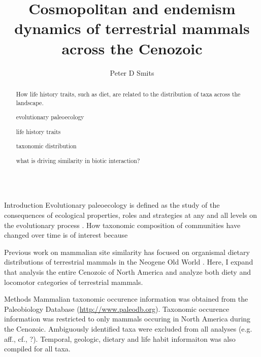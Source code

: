 \documentclass[final]{beamer}\usepackage[]{graphicx}\usepackage[]{color}
\title{Cosmopolitan and endemism dynamics of terrestrial mammals across the Cenozoic}
\author{Peter D Smits}
\institute{Committee on Evolutionary Biology, University of Chicago}
\newlength{\onecolwid}
\begin{document}
\begin{frame}[t]
  \begin{columns}
    \begin{column}{\onecolwid}
      \begin{block}{}
        \begin{abstract}
          How life history traits, such as diet, are related to the distribution of taxa across the landscape.

          evolutionary paleoecology

          life history traits

          taxonomic distribution

          what is driving similarity in biotic interaction?
        \end{abstract}
        
      \end{block}
      \begin{block}{Introduction}
%
        Evolutionary paleoecology is defined as the study of the consequences of ecological properties, roles and strategies at any and all levels on the evolutionary process \citet{Kitchell1985a}. 
%
%
        How taxonomic composition of communities have changed over time is of interest because

        Previous work on mammalian site similarity has focused on organismal dietary distributions of terrestrial mammals in the Neogene Old World \citep{Jernvall2002,Jernvall2004}. 
        Here, I expand that analysis the entire Cenozoic of North America and analyze both diety and locomotor categories of terrestrial mammals.
      \end{block}

      \begin{footnotesize}
      \begin{block}{Methods}
        Mammalian taxonomic occurence information was obtained from the Paleobiology Database (\url{http://www.paleodb.org}).
        Taxonomic occurence information was restricted to only mammals occuring in North America during the Cenozoic.
        Ambiguously identified taxa were excluded from all analyses (e.g. aff., cf., ?).
        Temporal, geologic, dietary and life habit informaiton was also compiled for all taxa.


\end{block}
\end{footnotesize}
\end{column}
\end{columns}
\end{frame}
\end{document}
